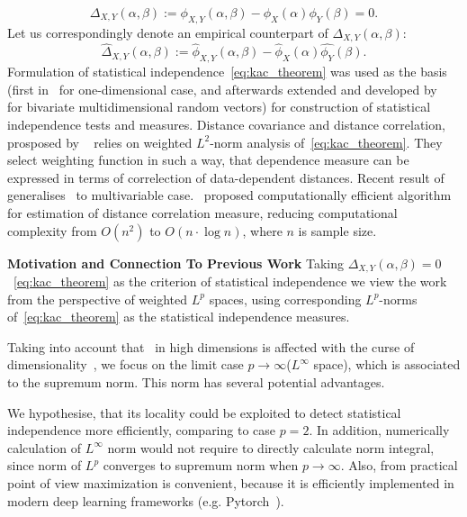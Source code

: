 \documentclass{article}
\begin{document}
\begin{equation}
\label{eq:kac_theorem}
\Delta_{X,Y}(\alpha, \beta) := \phi_{X,Y}(\alpha,\beta) - \phi_{X}(\alpha) \phi_{Y}(\beta) = 0.
\end{equation}
Let us correspondingly denote an empirical counterpart of $\Delta_{X,Y}(\alpha, \beta)$:
\begin{equation}
\label{eq:empirical_delta}
\widehat{\Delta}_{X,Y}(\alpha, \beta) := \widehat{\phi}_{X,Y}(\alpha,\beta) - \widehat{\phi}_{X}(\alpha) \widehat{\phi_{Y}}(\beta).
\end{equation}
Formulation of statistical independence~\eqref{eq:kac_theorem} was used as the basis (first in~\cite{Feuerverger} for one-dimensional case, and afterwards extended and developed by~\cite{Szekely} for bivariate multidimensional random vectors) for construction of statistical independence tests and measures. Distance covariance and distance correlation, prosposed by ~\cite{Szekely} relies on weighted $L^{2}$-norm analysis of~\eqref{eq:kac_theorem}. They select weighting function in such a way, that dependence measure can be expressed in terms of correlection of data-dependent distances. Recent result of~\cite{Bottcher} generalises~\cite{Szekely} to multivariable case.~\cite{CHAUDHURI201915} proposed computationally efficient algorithm for estimation of distance correlation measure, reducing computational complexity from $O(n^2)$ to $O(n\cdot \log n)$, where $n$ is sample size.

\textbf{Motivation and Connection To Previous Work} Taking $\Delta_{X,Y}(\alpha, \beta) = 0$~\eqref{eq:kac_theorem} as the criterion of statistical independence we view the work~\cite{Szekely} from the perspective of weighted $L^{p}$ spaces, using corresponding $L^{p}$-norms of~\eqref{eq:kac_theorem} as the statistical independence measures. 

Taking into account that~\cite{Szekely} in high dimensions is affected with the curse of dimensionality~\cite{Edlemann}, we focus on the limit case $p \rightarrow \infty$($L^{\infty}$ space), which is associated to the supremum norm. This norm has several potential advantages.



We hypothesise, that its locality could be exploited to detect statistical independence more efficiently, comparing to case $p=2$. 
In addition, numerically calculation of $L^{\infty} $ norm would not require to directly calculate norm integral, since norm of $L^{p}$ converges to supremum norm when $p \rightarrow \infty$. Also, from practical point of view maximization is convenient, because it is efficiently implemented in modern deep learning frameworks (e.g. Pytorch~\cite{NEURIPS2019_9015}).
\end{document}
